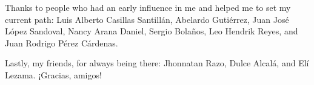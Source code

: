 Thanks to people who had an early influence in me and helped
me to set my current path: Luis Alberto Casillas
Santill\'an, Abelardo Guti\'errez, Juan Jos\'e L\'opez
Sandoval, Nancy Arana Daniel, Sergio Bola\~nos, Leo Hendrik
Reyes, and Juan Rodrigo P\'erez C\'ardenas.

Lastly, my friends, for always being there: Jhonnatan Razo,
Dulce Alcal\'a, and El\'i Lezama. ¡Gracias, amigos!

